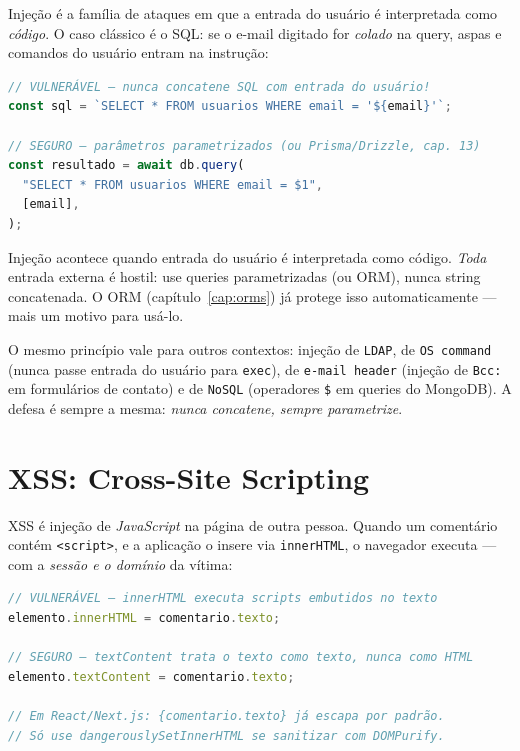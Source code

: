 Injeção é a família de ataques em que a entrada do usuário é interpretada como
\emph{código}. O caso clássico é o SQL: se o e-mail digitado for
\emph{colado} na query, aspas e comandos do usuário entram na instrução:

\begin{lstlisting}[style=livro, language=TypeScript,
  caption={Vulnerável vs seguro contra SQL injection.}, label={list:seg-sql}]
// VULNERÁVEL — nunca concatene SQL com entrada do usuário!
const sql = `SELECT * FROM usuarios WHERE email = '${email}'`;

// SEGURO — parâmetros parametrizados (ou Prisma/Drizzle, cap. 13)
const resultado = await db.query(
  "SELECT * FROM usuarios WHERE email = $1",
  [email],
);
\end{lstlisting}

\begin{caixaconceito}
Injeção acontece quando entrada do usuário é interpretada como código.
\emph{Toda} entrada externa é hostil: use queries parametrizadas (ou ORM),
nunca string concatenada. O ORM (capítulo~\ref{cap:orms}) já protege isso
automaticamente — mais um motivo para usá-lo.
\end{caixaconceito}

O mesmo princípio vale para outros contextos: injeção de \texttt{LDAP}, de
\texttt{OS command} (nunca passe entrada do usuário para \texttt{exec}), de
\texttt{e-mail header} (injeção de \texttt{Bcc:} em formulários de contato) e
de \texttt{NoSQL} (operadores \texttt{\$} em queries do MongoDB). A defesa é
sempre a mesma: \emph{nunca concatene, sempre parametrize}.

\section{XSS: Cross-Site Scripting}

XSS é injeção de \emph{JavaScript} na página de outra pessoa. Quando um
comentário contém \texttt{<script>}, e a aplicação o insere via
\texttt{innerHTML}, o navegador executa — com a \emph{sessão e o domínio} da
vítima:

\begin{lstlisting}[style=livro, language=TypeScript,
  caption={Vulnerável vs seguro contra XSS.}, label={list:seg-xss}]
// VULNERÁVEL — innerHTML executa scripts embutidos no texto
elemento.innerHTML = comentario.texto;

// SEGURO — textContent trata o texto como texto, nunca como HTML
elemento.textContent = comentario.texto;

// Em React/Next.js: {comentario.texto} já escapa por padrão.
// Só use dangerouslySetInnerHTML se sanitizar com DOMPurify.
\end{lstlisting}

